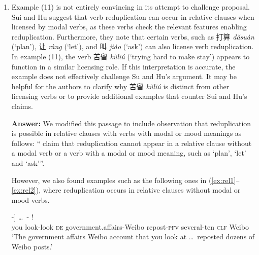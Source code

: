 \documentclass[fleqn,twoside]{article}
\begin{document}
\begin{enumerate}
    \item Example (11) is not entirely convincing in its attempt to challenge  proposal. Sui and Hu suggest that verb reduplication can occur in relative clauses when licensed by modal verbs, as these verbs check the relevant features enabling reduplication. Furthermore, they note that certain verbs, such as 打算 \textit{dǎsuàn} (`plan'), 让 \textit{ràng} (`let'), and 叫 \textit{jiào} (`ask') can also license verb
    reduplication. In example (11), the verb 苦留 \textit{kǔliú} (`trying hard to make stay')
    appears to function in a similar licensing role. If this interpretation is accurate, the example does not effectively challenge Su and Hu’s argument. It may be helpful for the authors to clarify why 苦留 \textit{kǔliú} is distinct from other licensing verbs or to provide additional examples that counter Sui and Hu's claims.
    
\noindent
\textbf{Answer:} We modified this passage to include  observation 
that reduplication is possible in relative clauses with 
verbs with modal or mood meanings as follows: ``\citet[319, 332]{SuiHu2016} claim that reduplication cannot appear in a relative clause without a modal verb or a verb with a modal or mood meaning, such as  `plan',  `let' and  `ask'''.
    
However, we also found examples such as the following ones in (\ref{ex:rel1}--\ref{ex:rel2}), 
where reduplication occurs in relative clauses without modal or mood verbs.
    
    
\ea\label{ex:rel1}
    \gll [[\objex{ni3} \obj{kan4-kan} \objex{de}] -] \ldots\,  -  !\\
    you look-look \textsc{de} government.affairs-Weibo {} repost-\textsc{pfv} several-ten \textsc{clf} Weibo\\ 
    \glt `The government affairs Weibo account that you look at \ldots\, reposted dozens of Weibo posts.'
    
    
    

\end{enumerate}
\end{document}

